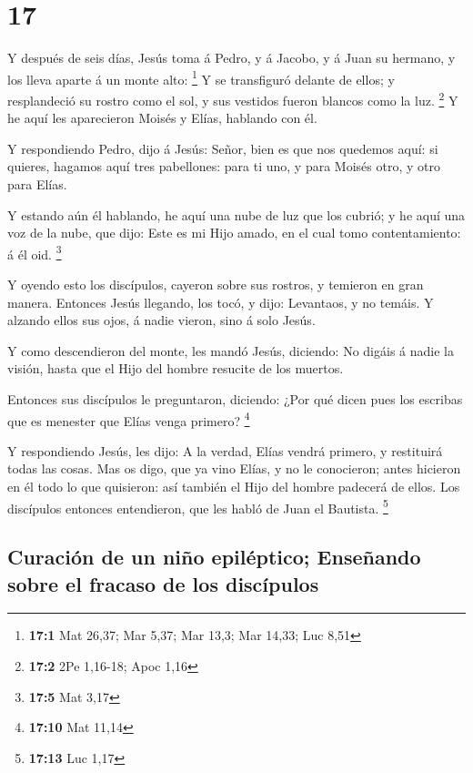 \hypertarget{section-16}{%
\section{17}\label{section-16}}

 Y después de seis días, Jesús toma á Pedro, y á Jacobo, y á
Juan su hermano, y los lleva aparte á un monte alto: \footnote{\textbf{17:1}
  Mat 26,37; Mar 5,37; Mar 13,3; Mar 14,33; Luc 8,51}  Y se
transfiguró delante de ellos; y resplandeció su rostro como el sol, y
sus vestidos fueron blancos como la luz. \footnote{\textbf{17:2} 2Pe
  1,16-18; Apoc 1,16}  Y he aquí les aparecieron Moisés y
Elías, hablando con él.

 Y respondiendo Pedro, dijo á Jesús: Señor, bien es que nos
quedemos aquí: si quieres, hagamos aquí tres pabellones: para ti uno, y
para Moisés otro, y otro para Elías.

 Y estando aún él hablando, he aquí una nube de luz que los
cubrió; y he aquí una voz de la nube, que dijo: Este es mi Hijo amado,
en el cual tomo contentamiento: á él oid. \footnote{\textbf{17:5} Mat
  3,17}

 Y oyendo esto los discípulos, cayeron sobre sus rostros, y
temieron en gran manera.  Entonces Jesús llegando, los tocó,
y dijo: Levantaos, y no temáis.  Y alzando ellos sus ojos, á
nadie vieron, sino á solo Jesús.

 Y como descendieron del monte, les mandó Jesús, diciendo:
No digáis á nadie la visión, hasta que el Hijo del hombre resucite de
los muertos.

 Entonces sus discípulos le preguntaron, diciendo: ¿Por qué
dicen pues los escribas que es menester que Elías venga primero?
\footnote{\textbf{17:10} Mat 11,14}

 Y respondiendo Jesús, les dijo: A la verdad, Elías vendrá
primero, y restituirá todas las cosas.  Mas os digo, que ya
vino Elías, y no le conocieron; antes hicieron en él todo lo que
quisieron: así también el Hijo del hombre padecerá de ellos.
 Los discípulos entonces entendieron, que les habló de Juan
el Bautista. \footnote{\textbf{17:13} Luc 1,17}

\hypertarget{curaciuxf3n-de-un-niuxf1o-epiluxe9ptico-enseuxf1ando-sobre-el-fracaso-de-los-discuxedpulos}{%
\subsection{Curación de un niño epiléptico; Enseñando sobre el fracaso
de los
discípulos}\label{curaciuxf3n-de-un-niuxf1o-epiluxe9ptico-enseuxf1ando-sobre-el-fracaso-de-los-discuxedpulos}}

